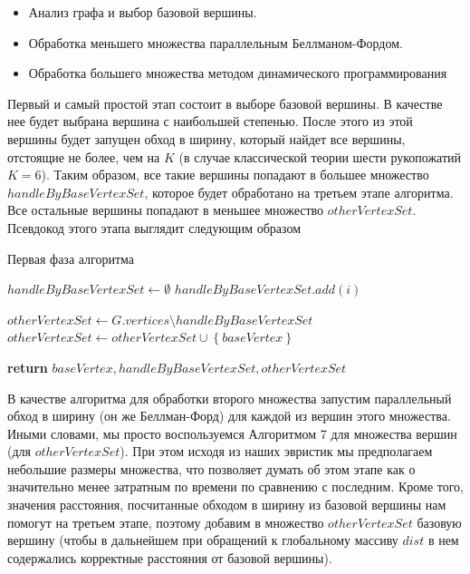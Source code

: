 \begin{itemize}
  \item Анализ графа и выбор базовой вершины. 
  \item Обработка меньшего множества параллельным Беллманом-Фордом.
  \item Обработка большего множества методом динамического программирования
\end{itemize}

Первый и самый простой этап состоит в выборе базовой вершины. В качестве нее будет выбрана вершина с наибольшей степенью. После этого из этой вершины будет запущен обход в ширину, который найдет все вершины, отстоящие не более, чем на $K$ (в случае классической теории шести рукопожатий $K = 6$). Таким образом, все такие вершины попадают в большее множество $handleByBaseVertexSet$, которое будет обработано на третьем этапе алгоритма. Все остальные вершины попадают в меньшее множество $otherVertexSet$. Псевдокод этого этапа выглядит следующим образом

\FloatBarrier
\begin{algorithm}
\caption{Первая фаза алгоритма}\label{all_pairs_social1}
\begin{algorithmic}[1]
\State $handleByBaseVertexSet \gets \emptyset$
\algrenewcommand{} 
\algrenewcommand{}
		\State $handleByBaseVertexSet.add(i)$
	\EndIf
\EndFor

\State $otherVertexSet \gets G.vertices \setminus handleByBaseVertexSet$
\State $otherVertexSet \gets otherVertexSet \cup  \left\{ {baseVertex}\right\}$
 
\State \textbf{return} $ baseVertex, handleByBaseVertexSet, otherVertexSet$
\EndProcedure

\end{algorithmic}
\end{algorithm}




В качестве алгоритма для обработки второго множества запустим параллельный обход в ширину (он же Беллман-Форд) для каждой из вершин этого множества. Иными словами, мы просто воспользуемся Алгоритмом 7 для множества вершин (для $otherVertexSet$). При этом исходя из наших эвристик мы предполагаем небольшие размеры множества, что позволяет думать об этом этапе как о значительно менее затратным по времени по сравнению с последним. Кроме того, значения расстояния, посчитанные обходом в ширину из базовой вершины нам помогут на третьем этапе, поэтому добавим в множество $otherVertexSet$ базовую вершину (чтобы в дальнейшем при обращений к глобальному массиву $dist$ в нем содержались корректные расстояния от базовой вершины).

